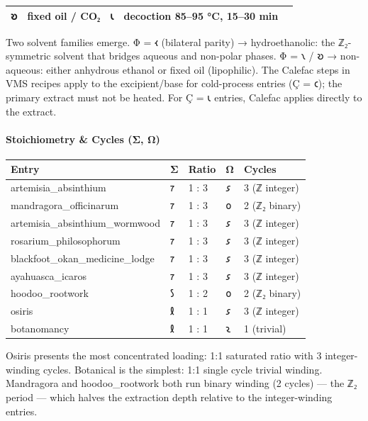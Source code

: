 \begin{longtable}[]{@{}lllll@{}}
\begin{minipage}[t]{0.17\columnwidth}
𐑹\strut
\end{minipage} & \begin{minipage}[t]{0.17\columnwidth}\raggedright
fixed oil / CO₂\strut
\end{minipage} & \begin{minipage}[t]{0.17\columnwidth}\raggedright
𐑧\strut
\end{minipage} & \begin{minipage}[t]{0.17\columnwidth}\raggedright
decoction 85--95 °C, 15--30 min\strut
\end{minipage}\tabularnewline
\bottomrule
\end{longtable}

Two solvent families emerge. Φ = 𐑬 (bilateral parity) → hydroethanolic:
the ℤ₂-symmetric solvent that bridges aqueous and non-polar phases. Φ =
𐑯 / 𐑹 → non-aqueous: either anhydrous ethanol or fixed oil (lipophilic).
The Calefac steps in VMS recipes apply to the excipient/base for
cold-process entries (Ç = 𐑤); the primary extract must not be heated.
For Ç = 𐑧 entries, Calefac applies directly to the extract.

\hypertarget{stoichiometry-cycles-ux3c3-ux3c9}{%
\paragraph{Stoichiometry \& Cycles (Σ,
Ω)}\label{stoichiometry-cycles-ux3c3-ux3c9}}

\begin{longtable}[]{@{}lllll@{}}
\toprule
Entry & Σ & Ratio & Ω & Cycles\tabularnewline
\midrule
\endhead
artemisia\_absinthium & 𐑳 & 1 : 3 & 𐑭 & 3 (ℤ integer)\tabularnewline
mandragora\_officinarum & 𐑳 & 1 : 3 & 𐑴 & 2 (ℤ₂ binary)\tabularnewline
artemisia\_absinthium\_wormwood & 𐑳 & 1 : 3 & 𐑭 & 3 (ℤ
integer)\tabularnewline
rosarium\_philosophorum & 𐑳 & 1 : 3 & 𐑭 & 3 (ℤ integer)\tabularnewline
blackfoot\_okan\_medicine\_lodge & 𐑳 & 1 : 3 & 𐑭 & 3 (ℤ
integer)\tabularnewline
ayahuasca\_icaros & 𐑳 & 1 : 3 & 𐑭 & 3 (ℤ integer)\tabularnewline
hoodoo\_rootwork & 𐑕 & 1 : 2 & 𐑴 & 2 (ℤ₂ binary)\tabularnewline
osiris & 𐑙 & 1 : 1 & 𐑭 & 3 (ℤ integer)\tabularnewline
botanomancy & 𐑙 & 1 : 1 & 𐑷 & 1 (trivial)\tabularnewline
\bottomrule
\end{longtable}

Osiris presents the most concentrated loading: 1:1 saturated ratio with
3 integer-winding cycles. Botanical is the simplest: 1:1 single cycle
trivial winding. Mandragora and hoodoo\_rootwork both run binary winding
(2 cycles) --- the ℤ₂ period --- which halves the extraction depth
relative to the integer-winding entries.

